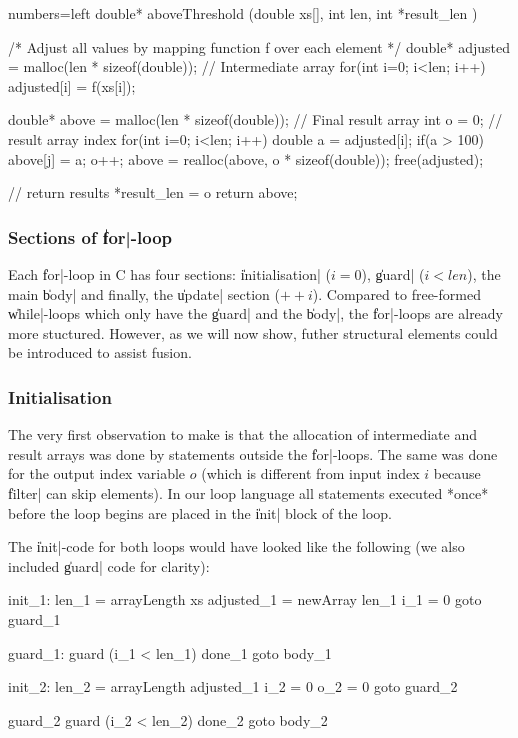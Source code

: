 \documentclass[preamble.tex]{subfiles}
\begin{document}
\begin{ccode}{numbers=left}
double* aboveThreshold (double xs[], int len, int *result_len ) {

  /* Adjust all values by mapping function f over each element */
  double* adjusted = malloc(len * sizeof(double)); // Intermediate array
  for(int i=0; i<len; i++) {
      adjusted[i] = f(xs[i]);
  }

  double* above = malloc(len * sizeof(double));     // Final result array
  int o = 0; // result array index
  for(int i=0; i<len; i++) {
      double a = adjusted[i];
      if(a > 100) {
          above[j] = a;
          o++;
      }
  }
  above = realloc(above, o * sizeof(double));
  free(adjusted);

  // return results
  *result_len = o
  return above;
}
\end{ccode}


\subsubsection{Sections of \|for|-loop}
Each \|for|-loop in C has four sections: \|initialisation| ($i=0$), \|guard| ($i<len$), the main \|body| and finally, the \|update| section ($++i$). Compared to free-formed \|while|-loops which only have the \|guard| and the \|body|, the \|for|-loops are already more stuctured. However, as we will now show, futher structural elements could be introduced to assist fusion.

\subsubsection{Initialisation}
The very first observation to make is that the allocation of intermediate and result arrays was done by statements outside the \|for|-loops. The same was done for the output index variable $o$ (which is different from input index $i$ because \|filter| can skip elements). In our loop language all statements executed *once* before the loop begins are placed in the \|init| block of the loop.

The \|init|-code for both loops would have looked like the following (we also included \|guard| code for clarity):
\begin{loopcode}
  init_1:
    len_1 = arrayLength xs
    adjusted_1 = newArray len_1
    i_1 = 0
    goto guard_1

  guard_1:
    guard (i_1 < len_1) done_1
    goto body_1

  init_2:
    len_2 = arrayLength adjusted_1
    i_2 = 0
    o_2 = 0
    goto guard_2

  guard_2
    guard (i_2 < len_2) done_2
    goto body_2

\end{loopcode}
\end{document}
